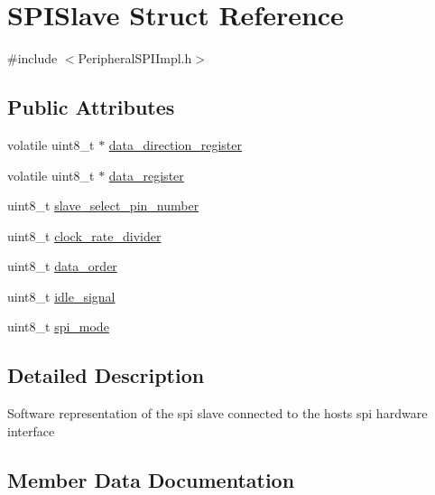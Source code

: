 \hypertarget{structSPISlave}{}\section{S\+P\+I\+Slave Struct Reference}
\label{structSPISlave}


{\ttfamily \#include $<$Peripheral\+S\+P\+I\+Impl.\+h$>$}

\subsection*{Public Attributes}
\begin{DoxyCompactItemize}
\item 
volatile uint8\+\_\+t $\ast$ \mbox{\hyperlink{structSPISlave_abf7a375633e77b232e1cbb12a0eb002d}{data\+\_\+direction\+\_\+register}}
\item 
volatile uint8\+\_\+t $\ast$ \mbox{\hyperlink{structSPISlave_abbc4e8f0ccaa89da51ca0e4ff24ad7e9}{data\+\_\+register}}
\item 
uint8\+\_\+t \mbox{\hyperlink{structSPISlave_a7cf55825192923f25fa0d288e9c29491}{slave\+\_\+select\+\_\+pin\+\_\+number}}
\item 
uint8\+\_\+t \mbox{\hyperlink{structSPISlave_a39b25a1f7290f19f47870690f0ec3cef}{clock\+\_\+rate\+\_\+divider}}
\item 
uint8\+\_\+t \mbox{\hyperlink{structSPISlave_ae7de4403de0e6393e4f2a8a34b98c845}{data\+\_\+order}}
\item 
uint8\+\_\+t \mbox{\hyperlink{structSPISlave_a8dd52992c7350335723d6d7dfbca5bab}{idle\+\_\+signal}}
\item 
uint8\+\_\+t \mbox{\hyperlink{structSPISlave_a0099538d21ea9158d57f8e825ffa8e22}{spi\+\_\+mode}}
\end{DoxyCompactItemize}


\subsection{Detailed Description}
Software representation of the spi slave connected to the hosts spi hardware interface 

\subsection{Member Data Documentation}
\mbox{\label{structSPISlave_a39b25a1f7290f19f47870690f0ec3cef}} 
